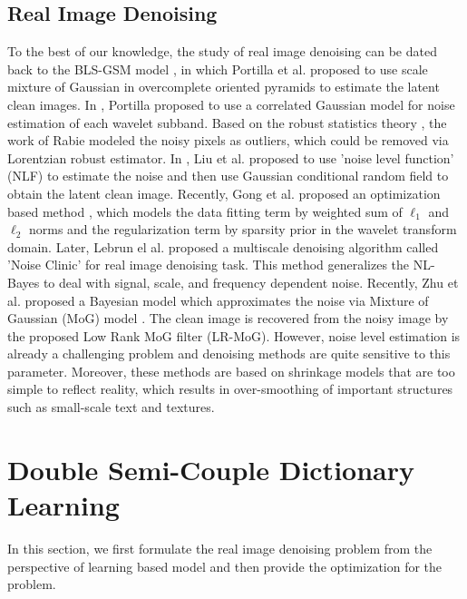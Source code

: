 \documentclass[10pt,twocolumn,letterpaper]{article}
\begin{document}
\subsection{Real Image Denoising}
To the best of our knowledge, the study of real image denoising can be dated back to the BLS-GSM model \cite{blsgsm}, in which Portilla et al. proposed to use scale mixture of Gaussian in overcomplete oriented pyramids to estimate the latent clean images. In \cite{fullyblind}, Portilla proposed to use a correlated Gaussian model for noise estimation of each wavelet subband. Based on the robust statistics theory \cite{huber2011robust}, the work of Rabie \cite{rabie2005robust} modeled the noisy pixels as outliers, which could be removed via Lorentzian robust estimator. In \cite{Liu2008}, Liu et al. proposed to use 'noise level function' (NLF) to estimate the noise and then use Gaussian conditional random field to obtain the latent clean image. Recently, Gong et al. proposed an optimization based method \cite{almapg}, which models the data fitting term by weighted sum of $\ell_{1}$ and $\ell_{2}$ norms and the regularization term by sparsity prior in the wavelet transform domain. Later, Lebrun el al. proposed a multiscale denoising algorithm called 'Noise Clinic' \cite{noiseclinic} for real image denoising task. This method generalizes the NL-Bayes \cite{nlbayes} to deal with signal, scale, and frequency dependent noise. Recently, Zhu et al. proposed a Bayesian model \cite{Zhu_2016_CVPR} which approximates the noise via Mixture of Gaussian (MoG) model \cite{Bishop}. The clean image is recovered from the noisy image by the proposed Low Rank MoG filter (LR-MoG). However, noise level estimation is already a challenging problem and denoising methods are quite sensitive to this parameter. Moreover, these methods are based on shrinkage models that are too simple to reflect reality, which results in over-smoothing of important structures such as small-scale text and textures. 

\section{Double Semi-Couple Dictionary Learning}
In this section, we first formulate the real image denoising problem from the perspective of learning based model and then provide the optimization for the problem.
\end{document}
